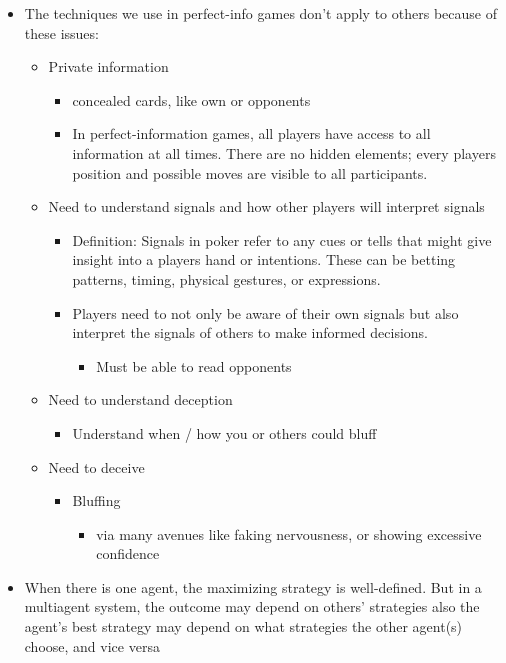 \documentclass[
]{article}
\begin{document}
\begin{itemize}
\item
  The techniques we use in perfect-info games don't apply to others
  because of these issues:

  \begin{itemize}
  \item
    Private information

    \begin{itemize}
    \item
      concealed cards, like own or opponents
    \item
      In perfect-information games, all players have access to all
      information at all times. There are no hidden elements; every
      player\textquotesingle s position and possible moves are visible
      to all participants.
    \end{itemize}
  \item
    Need to understand signals and how other players will interpret
    signals

    \begin{itemize}
    \item
      Definition: Signals in poker refer to any cues or tells that might
      give insight into a player\textquotesingle s hand or intentions.
      These can be betting patterns, timing, physical gestures, or
      expressions.
    \item
      Players need to not only be aware of their own signals but also
      interpret the signals of others to make informed decisions.

      \begin{itemize}
      \item
        Must be able to read opponents
      \end{itemize}
    \end{itemize}
  \item
    Need to understand deception

    \begin{itemize}
    \item
      Understand when / how you or others could bluff
    \end{itemize}
  \item
    Need to deceive

    \begin{itemize}
    \item
      Bluffing

      \begin{itemize}
      \item
        via many avenues like faking nervousness, or showing excessive
        confidence
      \end{itemize}
    \end{itemize}
  \end{itemize}
\item
  When there is one agent, the maximizing strategy is well-defined. But
  in a multiagent system, the outcome may depend on others' strategies
  also the agent's best strategy may depend on what strategies the other
  agent(s) choose, and vice versa
\end{itemize}
\end{document}
